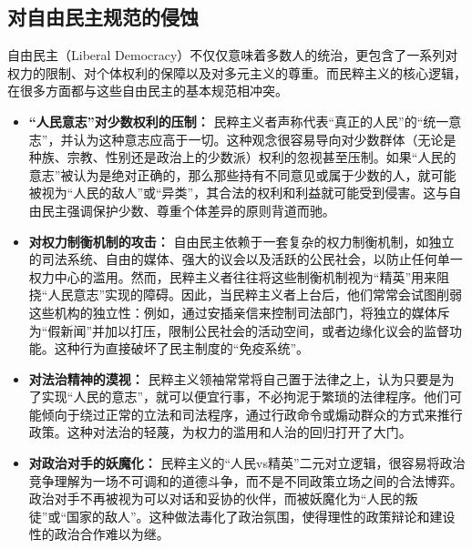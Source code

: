 \documentclass[UTF8, 10pt]{ctexbook}
\begin{document}
\subsection{对自由民主规范的侵蚀}
自由民主（Liberal Democracy）不仅仅意味着多数人的统治，更包含了一系列对权力的限制、对个体权利的保障以及对多元主义的尊重。而民粹主义的核心逻辑，在很多方面都与这些自由民主的基本规范相冲突。
\begin{itemize}
    \item \textbf{“人民意志”对少数权利的压制：} 民粹主义者声称代表“真正的人民”的“统一意志”，并认为这种意志应高于一切。这种观念很容易导向对少数群体（无论是种族、宗教、性别还是政治上的少数派）权利的忽视甚至压制。如果“人民的意志”被认为是绝对正确的，那么那些持有不同意见或属于少数的人，就可能被视为“人民的敌人”或“异类”，其合法的权利和利益就可能受到侵害。这与自由民主强调保护少数、尊重个体差异的原则背道而驰。
    \item \textbf{对权力制衡机制的攻击：} 自由民主依赖于一套复杂的权力制衡机制，如独立的司法系统、自由的媒体、强大的议会以及活跃的公民社会，以防止任何单一权力中心的滥用。然而，民粹主义者往往将这些制衡机制视为“精英”用来阻挠“人民意志”实现的障碍。因此，当民粹主义者上台后，他们常常会试图削弱这些机构的独立性：例如，通过安插亲信来控制司法部门，将独立的媒体斥为“假新闻”并加以打压，限制公民社会的活动空间，或者边缘化议会的监督功能。这种行为直接破坏了民主制度的“免疫系统”。
    \item \textbf{对法治精神的漠视：} 民粹主义领袖常常将自己置于法律之上，认为只要是为了实现“人民的意志”，就可以便宜行事，不必拘泥于繁琐的法律程序。他们可能倾向于绕过正常的立法和司法程序，通过行政命令或煽动群众的方式来推行政策。这种对法治的轻蔑，为权力的滥用和人治的回归打开了大门。
    \item \textbf{对政治对手的妖魔化：} 民粹主义的“人民vs精英”二元对立逻辑，很容易将政治竞争理解为一场不可调和的道德斗争，而不是不同政策立场之间的合法博弈。政治对手不再被视为可以对话和妥协的伙伴，而被妖魔化为“人民的叛徒”或“国家的敌人”。这种做法毒化了政治氛围，使得理性的政策辩论和建设性的政治合作难以为继。
\end{itemize}
\end{document}
